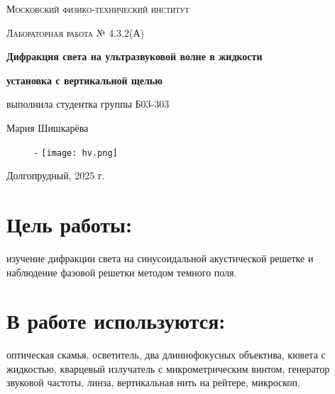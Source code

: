 \documentclass[a4paper, 12pt]{article}
\begin{document}
\begin{titlepage}
\centering
{\scshape\LARGE Московский физико-технический институт \par}
\vspace{3cm}
{\scshape\Large Лабораторная работа № 4.3.2(А) \par}
\vspace{1cm}
{\huge\bfseries Дифракция света на ультразвуковой волне в жидкости \par}
\vspace{0.5cm}
\vspace{1cm}
{\large\bfseries установка с вертикальной щелью \par}


\vfill
\begin{flushright}
{\large выполнила студентка группы Б03-303}\par
\vspace{0.3cm}
{\LARGE Мария Шишкарёва}
\end{flushright}
\vfill

\begin{figure}[h]
 \centering-
\texttt{[image: hv.png]}
\end{figure}
Долгопрудный, 2025 г.
\end{titlepage}





\large\section{Цель работы:}
изучение дифракции света на синусоидальной акустической решетке и наблюдение фазовой решетки методом темного поля.




\large\section{В работе используются:}
оптическая скамья, осветитель, два длиннофокусных объектива, кювета с жидкостью, кварцевый излучатель с микрометрическим винтом, генератор звуковой частоты, линза, вертикальная нить на рейтере, микроскоп.
\end{document}
